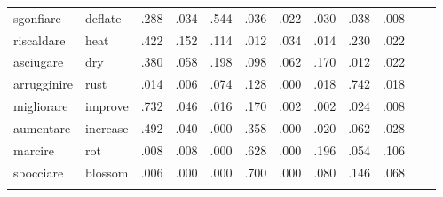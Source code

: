 \documentclass[output=paper,colorlinks,citecolor=brown
]{langscibook}
\begin{document}
\begin{table}[H]
\begin{tabular}{llllllllllll}
sgonfiare    & deflate  & .288     & .034   & .544                       & .036                                   & .022                                     & .030                  & .038                 & .008  \\
riscaldare   & heat     & .422     & .152  & .114                       & .012                                   & .034                                     & .014                  & .230                & .022  \\
asciugare    & dry      & .380     & .058   & .198                       & .098                                   & .062                                     & .170                 & .012                 & .022  \\
arrugginire  & rust     & .014      & .006   & .074                        & .128                                  & .000                                     & .018                  & .742                & .018  \\
migliorare   & improve  & .732     & .046   & .016                        & .170                                  & .002                                     & .002                  & .024                 & .008  \\
aumentare    & increase & .492     & .040   & .000                        & .358                                  & .000                                     & .020                  & .062                 & .028  \\
marcire      & rot      & .008      & .008   & .000                        & .628                                  & .000                                     & .196                 & .054                 & .106 \\
sbocciare    & blossom  & .006      & .000   & .000                        & .700                                  & .000                                     & .080                  & .146                & .068  \\
\lspbottomrule
\end{tabular}
\end{table}
 
 
\printbibliography[heading=subbibliography,notkeyword=this]
\end{document}
